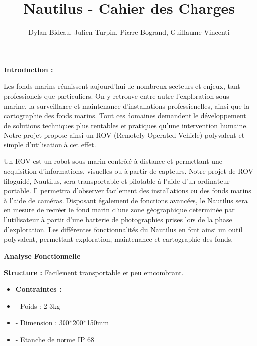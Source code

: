 \documentclass[a4paper,11pt]{report}
\author{Dylan Bideau, Julien Turpin, Pierre Bogrand, Guillaume Vincenti}
\title{Nautilus - Cahier des Charges}
\begin{document}
\maketitle

\textbf{\Huge Introduction :\newline \newline \newline \newline \newline \newline \newline \newline \newline}


Les fonds marins réunissent aujourd'hui de nombreux secteurs et enjeux, tant professionels que particuliers.
On y retrouve entre autre l'exploration sous-marine, la surveillance et maintenance d'installations professionelles, ainsi que la cartographie des fonds marins. Tout ces domaines demandent le développement de solutions techniques plus rentables et pratiques qu'une intervention humaine. Notre projet propose ainsi un ROV (Remotely Operated Vehicle) polyvalent et simple d'utilisation à cet effet.

Un ROV est un robot sous-marin contrôlé à distance et permettant une acquisition d'informations, visuelles ou à partir de capteurs. Notre projet de ROV filoguidé, Nautilus, sera transportable et pilotable à l'aide d'un ordinateur portable. Il permettra d'observer facilement des installations ou des fonds marins à l'aide de caméras. Disposant également de fonctions avancées, le Nautilus sera en mesure de recréer le fond marin d'une zone géographique déterminée par l'utilisateur à partir d'une batterie de photographies prises lors de la phase d'exploration. Les différentes fonctionnalités du Nautilus en font ainsi un outil polyvalent, permettant exploration, maintenance et cartographie des fonds.
\newpage

\textbf{\Huge Analyse Fonctionnelle \newline \newline}

\textbf{\LARGE Structure :\newline \newline}
Facilement transportable et peu emcombrant.\newline
\begin{itemize}
	\item \textbf{Contraintes :}
	\item - Poids : 2-3kg
	\item - Dimension : 300*200*150mm
	\item - Etanche de norme IP 68 \newline \newline
\end{itemize}
\end{document}
